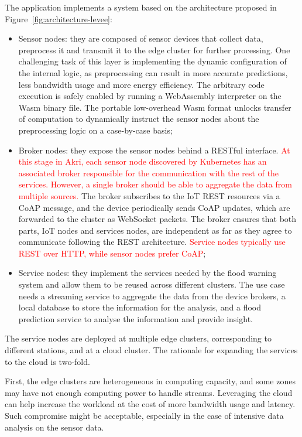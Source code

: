The application implements a system based on the architecture proposed in Figure~\ref{fig:architecture-levee}:

\begin{itemize}
    \item Sensor nodes: they are composed of sensor devices that collect data, preprocess it and transmit it to the edge cluster for further processing. One challenging task of this layer is implementing the dynamic configuration of the internal logic, as preprocessing can result in more accurate predictions, less bandwidth usage and more energy efficiency. The arbitrary code execution is safely enabled by running a WebAssembly interpreter on the Wasm binary file. The portable low-overhead Wasm format unlocks transfer of computation to dynamically instruct the sensor nodes about the preprocessing logic on a case-by-case basis;
    \item Broker nodes: they expose the sensor nodes behind a RESTful interface. \textcolor{red}{At this stage in Akri, each sensor node discovered by Kubernetes has an associated broker responsible for the communication with the rest of the services. However, a single broker should be able to aggregate the data from multiple sources.} The broker subscribes to the IoT REST resources via a CoAP message, and the device periodically sends CoAP updates, which are forwarded to the cluster as WebSocket packets. The broker ensures that both parts, IoT nodes and services nodes, are independent as far as they agree to communicate following the REST architecture. \textcolor{red}{Service nodes typically use REST over HTTP, while sensor nodes prefer CoAP};
    \item Service nodes: they implement the services needed by the flood warning system and allow them to be reused across different clusters. The use case needs a streaming service to aggregate the data from the device brokers, a local database to store the information for the analysis, and a flood prediction service to analyse the information and provide insight. 
\end{itemize}

The service nodes are deployed at multiple edge clusters, corresponding to different stations, and at a cloud cluster. The rationale for expanding the services to the cloud is two-fold.

First, the edge clusters are heterogeneous in computing capacity, and some zones may have not enough computing power to handle streams. Leveraging the cloud can help increase the workload at the cost of more bandwidth usage and latency. Such compromise might be acceptable, especially in the case of intensive data analysis on the sensor data.

